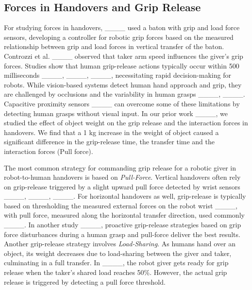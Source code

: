 \subsection{Forces in Handovers and Grip Release}
For studying forces in handovers, ____ used a baton with grip and load force sensors, developing a controller for robotic grip forces based on the measured relationship between grip and load forces in vertical transfer of the baton. Controzzi et al. ____ observed that taker arm speed influences the giver's grip forces.
Studies show that human grip-release actions typically occur within 500 milliseconds ____, ____, ____, necessitating rapid decision-making for robots. While vision-based systems detect human hand approach and grip, they are challenged by occlusions and the variability in human grasps ____, ____. Capacitive proximity sensors ____ can overcome some of these limitations by detecting human grasps without visual input. In our prior work ____, we studied the effect of object weight on the grip release and the interaction forces in handovers. We find that a 1 kg increase in the weight of object caused a significant difference in the grip-release time, the transfer time and the interaction forces (Pull force).

The most common strategy for commanding grip release for a robotic giver in robot-to-human handovers is based on \textit{Pull-Force}.
Vertical handovers often rely on grip-release triggered by a slight upward pull force detected by wrist sensors ____, ____, ____. For horizontal handovers as well, grip-release is typically based on thresholding the measured external forces on the robot wrist ____, with pull force, measured along the horizontal transfer direction, used commonly ____. In another study ____, proactive grip-release strategies based on grip force disturbances during a human grasp and pull-force deliver the best results. 
Another grip-release strategy involves \textit{Load-Sharing}. As humans hand over an object, its weight decreases due to load-sharing between the giver and taker, culminating in a full transfer. In ____, the robot giver gets ready for grip release when the taker's shared load reaches 50\%. However, the actual grip release is triggered by detecting a pull force threshold.


